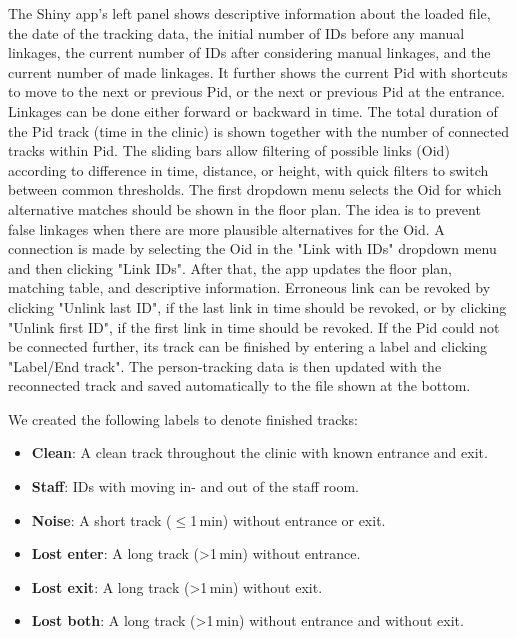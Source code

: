 \documentclass[fleqn,11pt]{wlscirep_supp}
\begin{document}
The Shiny app's left panel shows descriptive information about the loaded file, the date of the tracking data, the initial number of IDs before any manual linkages, the current number of IDs after considering manual linkages, and the current number of made linkages. It further shows the current Pid with shortcuts to move to the next or previous Pid, or the next or previous Pid at the entrance. Linkages can be done either forward or backward in time. The total duration of the Pid track (time in the clinic) is shown together with the number of connected tracks within Pid. The sliding bars allow filtering of possible links (Oid) according to difference in time, distance, or height, with quick filters to switch between common thresholds. The first dropdown menu selects the Oid for which alternative matches should be shown in the floor plan. The idea is to prevent false linkages when there are more plausible alternatives for the Oid. A connection is made by selecting the Oid in the "Link with IDs" dropdown menu and then clicking "Link IDs". After that, the app updates the floor plan, matching table, and descriptive information. Erroneous link can be revoked by clicking "Unlink last ID", if the last link in time should be revoked, or by clicking "Unlink first ID", if the first link in time should be revoked. If the Pid could not be connected further, its track can be finished by entering a label and clicking "Label/End track". The person-tracking data is then updated with the reconnected track and saved automatically to the file shown at the bottom.

We created the following labels to denote finished tracks: 
\begin{itemize}
    \item \textbf{Clean}: A clean track throughout the clinic with known entrance and exit.
    \item \textbf{Staff}: IDs with moving in- and out of the staff room.
    \item \textbf{Noise}: A short track ($\leq$1\,min) without entrance or exit.
    \item \textbf{Lost enter}: A long track (>1\,min) without entrance.
    \item \textbf{Lost exit}: A long track (>1\,min) without exit.
    \item \textbf{Lost both}: A long track (>1\,min) without entrance and without exit.
\end{itemize}
\end{document}
